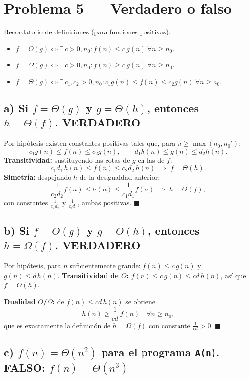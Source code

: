 \documentclass[11pt,letterpaper]{article}
\newcommand{\Th}{\Theta}
\begin{document}
\section*{Problema 5 --- Verdadero o falso}

Recordatorio de definiciones (para funciones positivas):
\begin{itemize}
\item $f = O(g) \iff \exists\, c>0, n_0 : f(n) \le c\, g(n)\ \forall n\ge n_0$.
\item $f = \Omega(g) \iff \exists\, c>0, n_0 : f(n) \ge c\, g(n)\ \forall n\ge n_0$.
\item $f = \Th(g) \iff \exists\, c_1, c_2 >0, n_0 : c_1 g(n) \le f(n) \le c_2 g(n)\ \forall n\ge n_0$.
\end{itemize}

\subsection*{a) Si $f = \Th(g)$ y $g = \Th(h)$, entonces $h = \Th(f)$. \quad \textbf{VERDADERO}}

Por hipótesis existen constantes positivas tales que, para $n \ge \max(n_0, n_0')$:
\[
c_1 g(n) \le f(n) \le c_2 g(n), \qquad d_1 h(n) \le g(n) \le d_2 h(n).
\]
\textbf{Transitividad:} sustituyendo las cotas de $g$ en las de $f$:
\[
c_1 d_1\, h(n) \le f(n) \le c_2 d_2\, h(n) \;\Rightarrow\; f = \Th(h).
\]
\textbf{Simetría:} despejando $h$ de la desigualdad anterior:
\[
\frac{1}{c_2 d_2} f(n) \le h(n) \le \frac{1}{c_1 d_1} f(n) \;\Rightarrow\; h = \Th(f),
\]
con constantes $\frac{1}{c_2 d_2}$ y $\frac{1}{c_1 d_1}$, ambas positivas. $\blacksquare$

\subsection*{b) Si $f = O(g)$ y $g = O(h)$, entonces $h = \Omega(f)$. \quad \textbf{VERDADERO}}

Por hipótesis, para $n$ suficientemente grande: $f(n) \le c\, g(n)$ y $g(n) \le d\, h(n)$.
\textbf{Transitividad de $O$:} $f(n) \le c\, g(n) \le cd\, h(n)$, así que $f = O(h)$.

\textbf{Dualidad $O$/$\Omega$:} de $f(n) \le cd\, h(n)$ se obtiene
\[
h(n) \ge \frac{1}{cd}\, f(n) \quad \forall n \ge n_0,
\]
que es exactamente la definición de $h = \Omega(f)$ con constante $\frac{1}{cd} > 0$. $\blacksquare$

\subsection*{c) $f(n) = \Th(n^2)$ para el programa \texttt{A(n)}. \quad \textbf{FALSO}: $f(n) = \Th(n^3)$}
\end{document}
